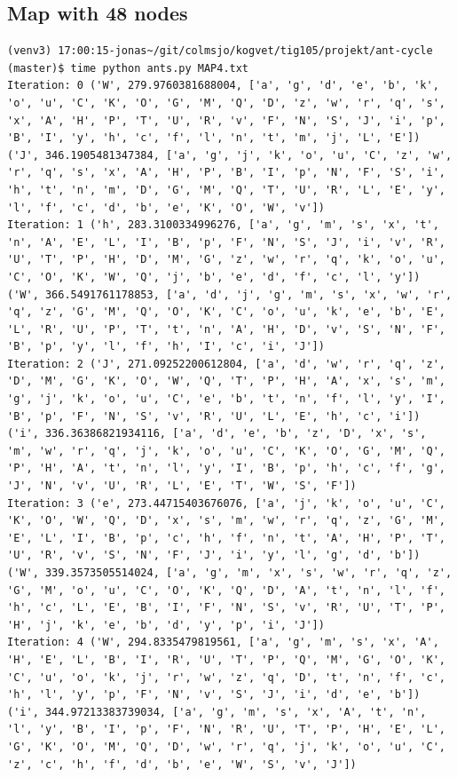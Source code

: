 \documentclass[11pt]{article}
\begin{document}
\subsection{Map with 48 nodes}

\begin{lstlisting}
(venv3) 17:00:15-jonas~/git/colmsjo/kogvet/tig105/projekt/ant-cycle (master)$ time python ants.py MAP4.txt
Iteration: 0 ('W', 279.9760381688004, ['a', 'g', 'd', 'e', 'b', 'k', 'o', 'u', 'C', 'K', 'O', 'G', 'M', 'Q', 'D', 'z', 'w', 'r', 'q', 's', 'x', 'A', 'H', 'P', 'T', 'U', 'R', 'v', 'F', 'N', 'S', 'J', 'i', 'p', 'B', 'I', 'y', 'h', 'c', 'f', 'l', 'n', 't', 'm', 'j', 'L', 'E']) ('J', 346.1905481347384, ['a', 'g', 'j', 'k', 'o', 'u', 'C', 'z', 'w', 'r', 'q', 's', 'x', 'A', 'H', 'P', 'B', 'I', 'p', 'N', 'F', 'S', 'i', 'h', 't', 'n', 'm', 'D', 'G', 'M', 'Q', 'T', 'U', 'R', 'L', 'E', 'y', 'l', 'f', 'c', 'd', 'b', 'e', 'K', 'O', 'W', 'v'])
Iteration: 1 ('h', 283.3100334996276, ['a', 'g', 'm', 's', 'x', 't', 'n', 'A', 'E', 'L', 'I', 'B', 'p', 'F', 'N', 'S', 'J', 'i', 'v', 'R', 'U', 'T', 'P', 'H', 'D', 'M', 'G', 'z', 'w', 'r', 'q', 'k', 'o', 'u', 'C', 'O', 'K', 'W', 'Q', 'j', 'b', 'e', 'd', 'f', 'c', 'l', 'y']) ('W', 366.5491761178853, ['a', 'd', 'j', 'g', 'm', 's', 'x', 'w', 'r', 'q', 'z', 'G', 'M', 'Q', 'O', 'K', 'C', 'o', 'u', 'k', 'e', 'b', 'E', 'L', 'R', 'U', 'P', 'T', 't', 'n', 'A', 'H', 'D', 'v', 'S', 'N', 'F', 'B', 'p', 'y', 'l', 'f', 'h', 'I', 'c', 'i', 'J'])
Iteration: 2 ('J', 271.09252200612804, ['a', 'd', 'w', 'r', 'q', 'z', 'D', 'M', 'G', 'K', 'O', 'W', 'Q', 'T', 'P', 'H', 'A', 'x', 's', 'm', 'g', 'j', 'k', 'o', 'u', 'C', 'e', 'b', 't', 'n', 'f', 'l', 'y', 'I', 'B', 'p', 'F', 'N', 'S', 'v', 'R', 'U', 'L', 'E', 'h', 'c', 'i']) ('i', 336.36386821934116, ['a', 'd', 'e', 'b', 'z', 'D', 'x', 's', 'm', 'w', 'r', 'q', 'j', 'k', 'o', 'u', 'C', 'K', 'O', 'G', 'M', 'Q', 'P', 'H', 'A', 't', 'n', 'l', 'y', 'I', 'B', 'p', 'h', 'c', 'f', 'g', 'J', 'N', 'v', 'U', 'R', 'L', 'E', 'T', 'W', 'S', 'F'])
Iteration: 3 ('e', 273.44715403676076, ['a', 'j', 'k', 'o', 'u', 'C', 'K', 'O', 'W', 'Q', 'D', 'x', 's', 'm', 'w', 'r', 'q', 'z', 'G', 'M', 'E', 'L', 'I', 'B', 'p', 'c', 'h', 'f', 'n', 't', 'A', 'H', 'P', 'T', 'U', 'R', 'v', 'S', 'N', 'F', 'J', 'i', 'y', 'l', 'g', 'd', 'b']) ('W', 339.3573505514024, ['a', 'g', 'm', 'x', 's', 'w', 'r', 'q', 'z', 'G', 'M', 'o', 'u', 'C', 'O', 'K', 'Q', 'D', 'A', 't', 'n', 'l', 'f', 'h', 'c', 'L', 'E', 'B', 'I', 'F', 'N', 'S', 'v', 'R', 'U', 'T', 'P', 'H', 'j', 'k', 'e', 'b', 'd', 'y', 'p', 'i', 'J'])
Iteration: 4 ('W', 294.8335479819561, ['a', 'g', 'm', 's', 'x', 'A', 'H', 'E', 'L', 'B', 'I', 'R', 'U', 'T', 'P', 'Q', 'M', 'G', 'O', 'K', 'C', 'u', 'o', 'k', 'j', 'r', 'w', 'z', 'q', 'D', 't', 'n', 'f', 'c', 'h', 'l', 'y', 'p', 'F', 'N', 'v', 'S', 'J', 'i', 'd', 'e', 'b']) ('i', 344.97213383739034, ['a', 'g', 'm', 's', 'x', 'A', 't', 'n', 'l', 'y', 'B', 'I', 'p', 'F', 'N', 'R', 'U', 'T', 'P', 'H', 'E', 'L', 'G', 'K', 'O', 'M', 'Q', 'D', 'w', 'r', 'q', 'j', 'k', 'o', 'u', 'C', 'z', 'c', 'h', 'f', 'd', 'b', 'e', 'W', 'S', 'v', 'J'])

\end{lstlisting}
\end{document}

